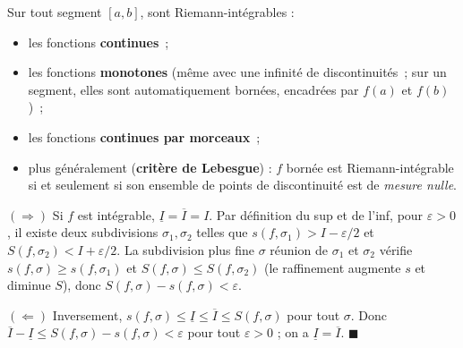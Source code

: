 
\begin{tcolorbox}[thmbox]
  Sur tout segment $[a,b]$, sont Riemann-intégrables :
  \begin{itemize}
    \item les fonctions \textbf{continues}~;
    \item les fonctions \textbf{monotones} (même avec une infinité de
          discontinuités~; sur un segment, elles sont automatiquement
          bornées, encadrées par $f(a)$ et $f(b)$)~;
    \item les fonctions \textbf{continues par morceaux}~;
    \item plus généralement (\textbf{critère de Lebesgue}) :
          $f$ bornée est Riemann-intégrable si et seulement si son ensemble
          de points de discontinuité est de \emph{mesure nulle}.
  \end{itemize}
\end{tcolorbox}

\decsep{}



\begin{mdframed}[style=proofbar]
  \textit{$(\Rightarrow)$}\enspace%
  Si $f$ est intégrable, $\underline{I}=\overline{I}=I$. Par définition du
  sup et de l'inf, pour $\varepsilon>0$, il existe deux subdivisions
  $\sigma_1, \sigma_2$ telles que $s(f,\sigma_1) > I - \varepsilon/2$ et
  $S(f,\sigma_2) < I + \varepsilon/2$. La subdivision plus fine $\sigma$
  réunion de $\sigma_1$ et $\sigma_2$ vérifie
  $s(f,\sigma)\geq s(f,\sigma_1)$ et $S(f,\sigma)\leq S(f,\sigma_2)$
  (le raffinement augmente $s$ et diminue $S$), donc
  $S(f,\sigma) - s(f,\sigma) < \varepsilon$.

  \medskip
  \textit{$(\Leftarrow)$}\enspace%
  Inversement, $s(f,\sigma) \leq \underline{I} \leq \overline{I} \leq S(f,\sigma)$
  pour tout $\sigma$. Donc $\overline{I} - \underline{I} \leq S(f,\sigma) - s(f,\sigma) < \varepsilon$
  pour tout $\varepsilon>0$ ; on a $\underline{I} = \overline{I}$.
  \hfill$\blacksquare$
\end{mdframed}


